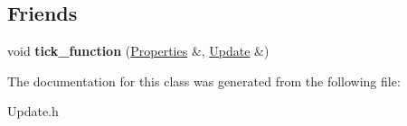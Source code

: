 \subsection*{Friends}
\begin{DoxyCompactItemize}
\item 
\hypertarget{class_update_af90c3329e2433f8dce3ad0ae3b483cfe}{void {\bfseries tick\-\_\-function} (\hyperlink{struct_properties}{Properties} \&, \hyperlink{class_update}{Update} \&)}\label{class_update_af90c3329e2433f8dce3ad0ae3b483cfe}

\end{DoxyCompactItemize}


The documentation for this class was generated from the following file\-:\begin{DoxyCompactItemize}
\item 
Update.\-h\end{DoxyCompactItemize}
